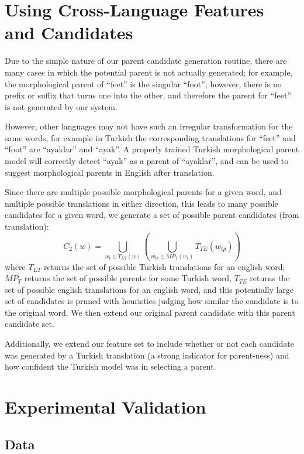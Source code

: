 \documentclass[11pt,twocolumn]{article}
\begin{document}
\section{Using Cross-Language Features and Candidates}
Due to the simple nature of our parent candidate generation routine,
there are many cases in which the potential parent is not actually generated;
for example, the morphological parent of ``feet'' is the singular ``foot'';
however, there is no prefix or suffix that turns one into the other, and
therefore the parent for ``feet'' is not generated by our system.

However, other languages may not have such an irregular transformation
for the same words, for example in Turkish the corresponding translations
for ``feet'' and ``foot'' are ``ayaklar'' and ``ayak''. A properly trained Turkish
morphological parent model will correctly detect ``ayak'' as a parent of ``ayaklar'',
and can be used to suggest morphological parents in English after translation.

Since there are multiple possible morphological parents for a given word, and multiple
possible translations in either direction, this leads to many possible candidates for a given word,
we generate a set of possible parent candidates (from translation):
\begin{equation}
    C_2(w) = \bigcup_{w_t \in T_{ET}(w)}\left(\bigcup_{w_{tp} \in MP_T (w_t)} T_{TE}(w_{tp})\right)
\end{equation}
where $T_{ET}$ returns the set of possible Turkish translations
for an english word; $MP_T$ returns the set of possible parents for some Turkish word,
$T_{TE}$ returns the set of possible english translations for an english word,
and this potentially large set of candidates is pruned with heuristics judging
how similar the candidate is to the original word. We then extend our original parent candidate
with this parent candidate set.

Additionally, we extend our feature set to include whether or not each candidate was
generated by a Turkish translation (a strong indicator for parent-ness) and how confident
the Turkish model was in selecting a parent.

\section{Experimental Validation}

\subsection{Data}
\end{document}
